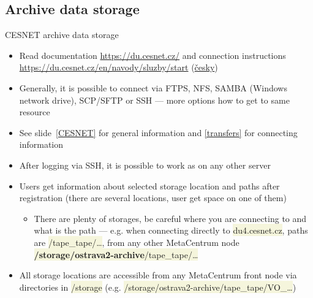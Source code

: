 \documentclass[compress, ucs, xelatex, 11pt, xcolor=svgnames, aspectratio=169,
	hyperref={
		bookmarks=true,
		unicode=true,
		colorlinks=true,
		pdftitle={Linux, command line and MetaCentrum},
		plainpages=false,
		pdfauthor={Vojtech Zeisek},
		pdfsubject={Course about use of Linux command line, writing shell scripts and using MetaCentrum of CESNET},
		pdfcreator={XeLaTeX},
		pdfkeywords={Linux, GNU, BASH, shell, command line, MetaCentrum},
		linkcolor=DarkRed, %
		anchorcolor=DarkBlue, %
		citecolor=Indigo, %
		filecolor=NavyBlue, %
		menucolor=DarkMagenta, %
		urlcolor=DarkBlue, %
		pdftex},
	url={hyphens, lowtilde} %
	]{beamer}
\renewcommand{\texttt}[1]{\colorbox{Beige}{{\ttfamily #1}}}
\begin{document}
\subsection{Archive data storage}

\begin{frame}{CESNET archive data storage}
	\begin{itemize}
		\item Read documentation \url{https://du.cesnet.cz/} and connection instructions \url{https://du.cesnet.cz/en/navody/sluzby/start} (\href{https://du.cesnet.cz/cs/navody/sluzby/start}{česky})
		\item Generally, it is possible to connect via FTPS, NFS, SAMBA (Windows network drive), SCP/SFTP or SSH --- more options how to get to same resource
		\item See slide~\ref{CESNET} for general information and \ref{transfers} for connecting information
		\item After logging via SSH, it is possible to work as on any other server
		\item Users get information about selected storage location and paths after registration (there are several locations, user get space on one of them)
		\begin{itemize}
			\item There are plenty of storages, be careful where you are connecting to and what is the path --- e.g. when connecting directly to \texttt{du4.cesnet.cz}, paths are \texttt{/tape\_tape/\ldots}, from any other MetaCentrum node \texttt{\textbf{/storage/ostrava2-archive}/tape\_tape/\ldots}
		\end{itemize}
		\item All storage locations are accessible from any MetaCentrum front node via directories in \texttt{/storage} (e.g. \texttt{/storage/ostrava2-archive/tape\_tape/VO\_\ldots})
	\end{itemize}
\end{frame}
\end{document}
